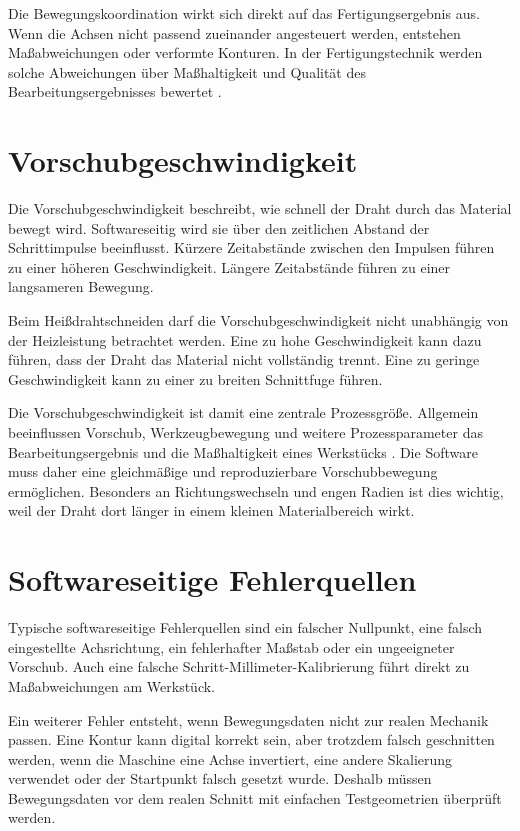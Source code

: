Die Bewegungskoordination wirkt sich direkt auf das Fertigungsergebnis aus. Wenn die Achsen nicht passend zueinander angesteuert werden, entstehen Maßabweichungen oder verformte Konturen. In der Fertigungstechnik werden solche Abweichungen über Maßhaltigkeit und Qualität des Bearbeitungsergebnisses bewertet \cite{Fritz:2022}.

\section{Vorschubgeschwindigkeit}
\label{sec:vorschubgeschwindigkeit_software}

Die Vorschubgeschwindigkeit beschreibt, wie schnell der Draht durch das Material bewegt wird. Softwareseitig wird sie über den zeitlichen Abstand der Schrittimpulse beeinflusst. Kürzere Zeitabstände zwischen den Impulsen führen zu einer höheren Geschwindigkeit. Längere Zeitabstände führen zu einer langsameren Bewegung.

Beim Heißdrahtschneiden darf die Vorschubgeschwindigkeit nicht unabhängig von der Heizleistung betrachtet werden. Eine zu hohe Geschwindigkeit kann dazu führen, dass der Draht das Material nicht vollständig trennt. Eine zu geringe Geschwindigkeit kann zu einer zu breiten Schnittfuge führen.

Die Vorschubgeschwindigkeit ist damit eine zentrale Prozessgröße. Allgemein beeinflussen Vorschub, Werkzeugbewegung und weitere Prozessparameter das Bearbeitungsergebnis und die Maßhaltigkeit eines Werkstücks \cite{Fritz:2022}. Die Software muss daher eine gleichmäßige und reproduzierbare Vorschubbewegung ermöglichen. Besonders an Richtungswechseln und engen Radien ist dies wichtig, weil der Draht dort länger in einem kleinen Materialbereich wirkt.

\section{Softwareseitige Fehlerquellen}
\label{sec:softwareseitige_fehlerquellen}

Typische softwareseitige Fehlerquellen sind ein falscher Nullpunkt, eine falsch eingestellte Achsrichtung, ein fehlerhafter Maßstab oder ein ungeeigneter Vorschub. Auch eine falsche Schritt-Millimeter-Kalibrierung führt direkt zu Maßabweichungen am Werkstück.

Ein weiterer Fehler entsteht, wenn Bewegungsdaten nicht zur realen Mechanik passen. Eine Kontur kann digital korrekt sein, aber trotzdem falsch geschnitten werden, wenn die Maschine eine Achse invertiert, eine andere Skalierung verwendet oder der Startpunkt falsch gesetzt wurde. Deshalb müssen Bewegungsdaten vor dem realen Schnitt mit einfachen Testgeometrien überprüft werden.

